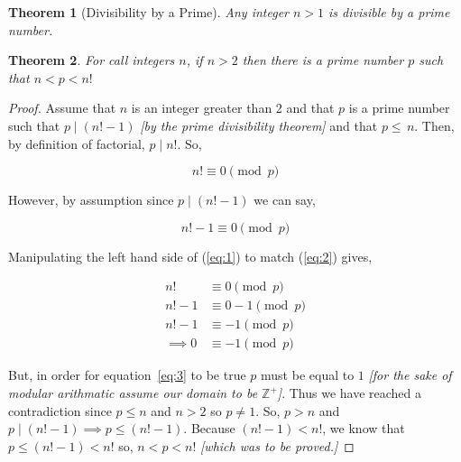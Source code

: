 \documentclass{article}
\newtheorem{theorem}{Theorem}
\begin{document}
\begin{theorem}[Divisibility by a Prime]
Any integer $n>1$ is divisible by a prime number.
\end{theorem}

\begin{theorem}
For call integers $n$, if $n>2$ then there is a prime number $p$ such that $n<p<n\textbf{!}$
\end{theorem}

\begin{proof}
  Assume that $n$ is an integer greater than 2 and that $p$ is a prime number such that $p \mid \left(n\textbf{!} - 1\right)$ \textit{[by the prime divisibility theorem]} and that $p\leq\,n$. Then, by definition of factorial, $p \mid n\textbf{!}$. So, 

  \begin{equation}
    n\textbf{!} \equiv 0 \pmod{p}
  \label{eq:1}
  \end{equation}

  However, by assumption since $p \mid \left(n\textbf{!}-1\right)$ we can say,

  \begin{equation}
    n\textbf{!} - 1 \equiv 0 \pmod{p}
  \label{eq:2}
  \end{equation}

  Manipulating the left hand side of (\ref{eq:1}) to match (\ref{eq:2}) gives,

  \begin{align}
    n\textbf{!} &\equiv 0 \pmod{p} \nonumber \\ 
    n\textbf{!} - 1 &\equiv 0 - 1 \pmod{p} \nonumber \\ 
    n\textbf{!} - 1 &\equiv -1 \pmod{p} \nonumber \\ 
    \implies 0 &\equiv -1 \pmod{p} \label{eq:3}
  \end{align}

  But, in order for equation~\ref{eq:3} to be true $p$ must be equal to $1$ \textit{[for the sake of modular arithmatic assume our domain to be $\mathbb{Z}^{+}$]}. Thus we have reached a contradiction since $p \leq n$ and $n > 2$ so $p \ne 1$. So, $p > n$ and \\ $p \mid \left(n\textbf{!}-1\right) \implies p \leq \left(n\textbf{!}-1\right)$. Because $\left(n\textbf{!}-1\right) < n\textbf{!}$, we know that \\ $p \leq \left(n\textbf{!}-1\right) < n\textbf{!}$ so, $n < p < n\textbf{!}$ \textit{[which was to be proved.]}
\end{proof}
\end{document}
